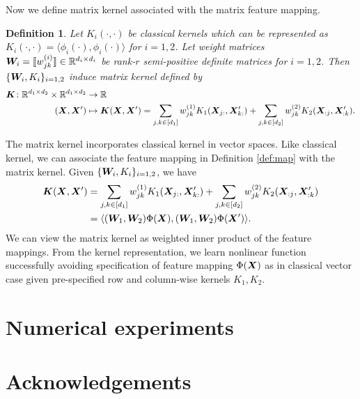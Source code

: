 \documentclass[mathptm]{statsoc}
\newtheorem{defn}{Definition}
\begin{document}
Now we define matrix kernel associated with the matrix feature mapping.
\begin{defn}\label{def:kernel}
Let $K_i(\cdot,\cdot)$ be classical kernels which can be represented as $K_i(\cdot,\cdot) = \langle \phi_i(\cdot),\phi_i(\cdot)\rangle$ for $i=1,2$. Let weight matrices $\bm{W}_i = \llbracket w^{(i)}_{jk} \rrbracket\in\mathbb{R}^{d_i\times d_i}$ be  rank-$r$ semi-positive definite matrices for $i = 1,2$. Then $\{\bm{W}_i,K_i\}_{i=1,2}$  induce matrix kernel defined by
\begin{align}
    \bm K\colon\mathbb{R}^{d_1\times d_2}\times \mathbb{R}^{d_1\times d_2}&\rightarrow \mathbb{R}\\
    (\bm X,\bm X')&\mapsto \bm K(\bm X,\bm X')  = \sum_{j,k\in[d_1]}w^{(1)}_{jk}K_1(\bm X_{j:},\bm X'_{k:})+\sum_{j,k\in[d_2]}w^{(2)}_{jk}K_2(\bm X_{:j},\bm X'_{:k}).
\end{align}
\end{defn}
The matrix kernel incorporates classical kernel in vector spaces. Like classical kernel, we can associate the feature mapping in Definition \ref{def:map} with the matrix kernel. Given $\{\bm{W}_i,K_i\}_{i=1,2}$, we have
\begin{align}\bm K(\bm X,\bm X')& = \sum_{j,k\in[d_1]}w^{(1)}_{jk}K_1(\bm X_{j:},\bm X'_{k:})+\sum_{j,k\in[d_2]}w^{(2)}_{jk}K_2(\bm X_{:j},\bm X'_{:k}) \\
&=\langle (\bm{W}_1,\bm{W}_2)\Phi(\bm X),(\bm{W}_1,\bm{W}_2)\Phi(\bm X')\rangle.
\end{align}
We can view the matrix kernel as weighted inner product of the feature mappings. From the kernel representation, we learn nonlinear function successfully  avoiding specification of feature mapping $\Phi(\bm X)$ as in classical vector case given pre-specified row and column-wise kernels $K_1,K_2$.
\section{Numerical experiments}



\section*{Acknowledgements}




\end{document}
